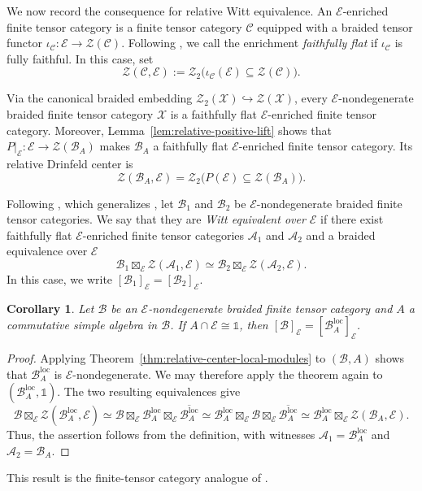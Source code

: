 \documentclass[11pt,reqno]{amsart}
\numberwithin{equation}{section}
\theoremstyle{plain}
\newtheorem{corollary}[thmctr]{Corollary}
\theoremstyle{definition}
\theoremstyle{remark}
\newcommand{\unit}{\mathds{1}}
\newcommand{\B}{\mathcal{B}}
\newcommand{\C}{\mathcal{C}}
\newcommand{\E}{\mathcal{E}}
\newcommand{\Z}{\mathcal{Z}}
\newcommand{\loc}{\mathrm{loc}}
\begin{document}
We now record the consequence for relative Witt equivalence. 
An $\E$-enriched finite tensor category is a finite tensor category
$\C$ equipped with a braided tensor functor
$\iota_{\C}:\E\to\Z(\C)$. Following
\cite[\S5.3]{decoppetstroinski2026pre}, we call the enrichment
\emph{faithfully flat} if $\iota_{\C}$ is fully faithful. In this case, set
\[
  \Z(\C,\E)
  :=
  \Z_2\bigl(\iota_{\C}(\E)\subseteq\Z(\C)\bigr).
\] 

Via the canonical braided embedding
$\Z_2(\mathcal X)\hookrightarrow\Z(\mathcal X)$, every
$\E$-nondegenerate braided finite tensor category $\mathcal X$ is a
faithfully flat $\E$-enriched finite tensor category. Moreover,
Lemma~\ref{lem:relative-positive-lift} shows that
$P|_{\E}:\E\to\Z(\B_A)$ makes $\B_A$ a faithfully flat
$\E$-enriched finite tensor category. Its relative Drinfeld center is
\[
  \Z(\B_A,\E)
  =
  \Z_2\bigl(P(\E)\subseteq\Z(\B_A)\bigr).
\]

Following
\cite[Definition~5.9]{decoppetstroinski2026pre}, which generalizes
\cite[Definition~5.1]{davydov2013structure}, let $\B_1$ and $\B_2$ be
$\E$-nondegenerate braided finite tensor categories. We say
that they are \emph{Witt equivalent over $\E$} if there exist faithfully flat
$\E$-enriched finite tensor categories $\mathcal A_1$ and $\mathcal A_2$ and
a braided equivalence over $\E$
\[
  \B_1\boxtimes_{\E}\Z(\mathcal A_1,\E)
  \simeq
  \B_2\boxtimes_{\E}\Z(\mathcal A_2,\E).
\]
In this case, we write $[\B_1]_{\E}=[\B_2]_{\E}$.

\begin{corollary}\label{cor:relative-witt-local-modules}
Let $\B$ be an $\E$-nondegenerate braided finite tensor category and $A$ a commutative simple algebra in $\B$. If $A\cap\E\cong\unit$, then
$[\B]_{\E}=[\B_A^{\loc}]_{\E}$.
\end{corollary}

\begin{proof}
Applying Theorem~\ref{thm:relative-center-local-modules} to $(\B,A)$ shows
that $\B_A^{\loc}$ is $\E$-nondegenerate. We may therefore apply the theorem
again to $(\B_A^{\loc},\unit)$. The two resulting equivalences give
\[
  \B\boxtimes_{\E}\Z(\B_A^\loc,\E) \simeq
  \B\boxtimes_{\E}\B_A^\loc\boxtimes_{\E}\overline{\B_A^\loc}
  \simeq
  \B_A^\loc \boxtimes_{\E}\B\boxtimes_{\E}\overline{\B_A^\loc}
  \simeq
  \B_A^\loc \boxtimes_{\E}\Z(\B_A,\E).
\]
Thus, the assertion follows from the definition, with witnesses
$\mathcal A_1=\B_A^\loc$ and $\mathcal A_2=\B_A$. 
\end{proof}
This result is the finite-tensor category analogue of
\cite[Proposition~5.3]{davydov2013structure}.



\end{document}
